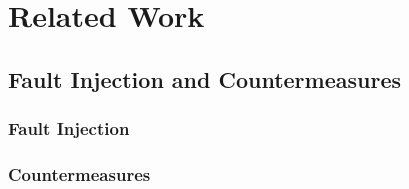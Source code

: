 \section{Related Work}
\subsection{Fault Injection and Countermeasures}
\subsubsection{Fault Injection}
\subsubsection{Countermeasures}\label{subsec:countermeasures}


